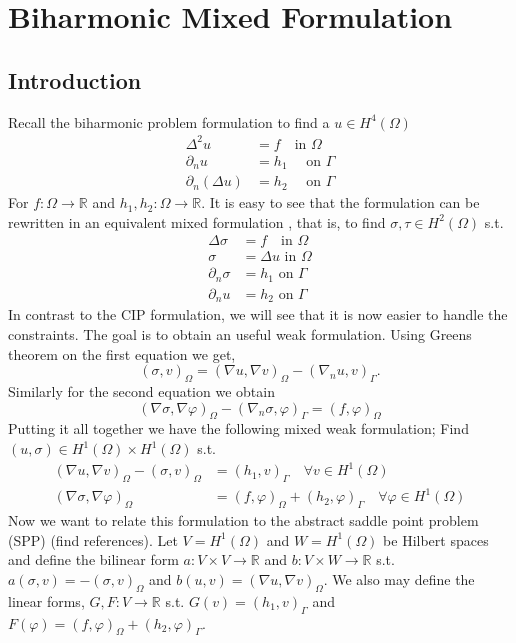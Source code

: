 
\newpage
\section{Biharmonic Mixed Formulation}%
\label{sec:biharmonic_mixed_formulation}


\subsection{Introduction}%
\label{sub:introduction}

Recall the biharmonic problem formulation to find a $u \in H^4( \Omega ) $  \[
    \begin{split}
\Delta ^2 u & = f \quad  \text{in } \Omega \\
\partial _{n} u & = h_{1} \quad \text{ on } \Gamma  \\
\partial _{n}( \Delta u)  & = h_{2} \quad \text{ on } \Gamma
    \end{split}
\]
For $f: \Omega  \to  \mathbb{R} $ and $h_{1},h_{2}: \Omega  \to \mathbb{R}  $. It is easy to see
that the formulation can be rewritten in an equivalent mixed formulation , that is, to find $\sigma, \tau  \in H^2( \Omega ) $ s.t. \[
    \begin{split}
\Delta \sigma  & = f \quad  \text{in } \Omega \\
\sigma   & = \Delta u  \text{ in } \Omega \\
\partial _{n} \sigma  & = h_{1} \text{ on } \Gamma  \\
\partial _{n} u   & = h_{2} \text{ on } \Gamma
    \end{split}
\]
In contrast to the CIP formulation, we will see that it is now easier to handle the constraints.
The goal is to obtain an useful weak formulation. Using Greens theorem on the first equation we get,
\[
( \sigma, v)_{\Omega } = ( \nabla  u , \nabla v  )_{\Omega } - ( \nabla _{n} u , v) _{\Gamma }.
\]
Similarly for the second equation we obtain
\[
( \nabla \sigma , \nabla \varphi  )_{\Omega} - ( \nabla _{n} \sigma ,  \varphi )_{\Gamma } = ( f,\varphi ) _{\Omega}
\]
Putting it all together we have the following mixed weak formulation; Find $( u, \sigma ) \in H^{1}( \Omega ) \times H^{1}( \Omega )  $ s.t. \[
    \begin{split}
     ( \nabla  u , \nabla v  )_{\Omega } -( \sigma, v)_{\Omega }  & =   ( h_{1} , v) _{\Gamma } \quad  \forall v \in H^{1}( \Omega ) \\
( \nabla \sigma , \nabla \varphi  )_{\Omega}  & = ( f,\varphi ) _{\Omega} + ( h_{2} ,  \varphi )_{\Gamma } \quad  \forall \varphi \in H^{1}( \Omega )
    \end{split}
\]
Now we want to relate this formulation to the abstract saddle point problem (SPP) (find references).
Let $V = H^{1}( \Omega ) $  and $W=H^{1}( \Omega ) $ be  Hilbert spaces and define the bilinear form $a: V\times V \to \mathbb{R}  $ and $b: V \times W \to \mathbb{R} $ s.t. $a( \sigma,v ) = - ( \sigma , v) _{\Omega }  $ and $b( u,v) = ( \nabla u,
\nabla v)_{\Omega  }  $. We also may define the linear forms, $G,F: V \to \mathbb{R} $ s.t. $ G( v)  = ( h_{1}, v) _{\Gamma } $ and $F( \varphi ) = ( f, \varphi )_{\Omega } + ( h_{2}, \varphi )_{\Gamma } $.


